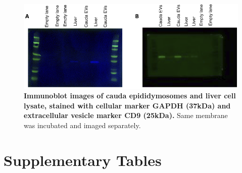 \documentclass[12pt,twoside]{reedthesis}
\begin{document}
\begin{figure}[htbp]

{\centering \includegraphics{thesis_files/figure-latex/es6-1} 

}

\caption[Immunoblot images of cauda epididymosomes and liver cell lysate, stained with cellular marker GAPDH (37kDa) and extracellular vesicle marker CD9 (25kDa)]{\textbf{Immunoblot images of cauda epididymosomes and liver cell lysate, stained with cellular marker GAPDH (37kDa) and extracellular vesicle marker CD9 (25kDa).} Same membrane was incubated and imaged separately.}\label{fig:es6}
\end{figure}
\hypertarget{supplementary-tables}{%
\section{Supplementary Tables}\label{supplementary-tables}}
\end{document}
